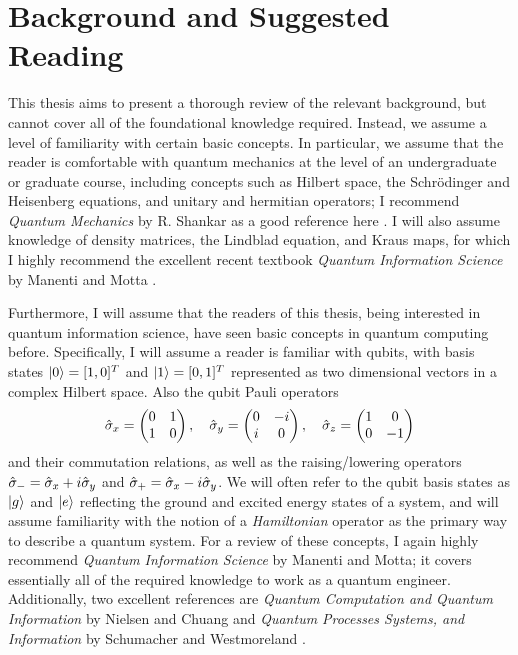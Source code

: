 \section{Background and Suggested Reading}

This thesis aims to present a thorough review of the relevant background, but cannot cover all of the foundational knowledge required. Instead, we assume a level of familiarity with certain basic concepts. In particular, we assume that the reader is comfortable with quantum mechanics at the level of an undergraduate or graduate course, including concepts such as Hilbert space, the Schr\"odinger and Heisenberg equations, and unitary and hermitian operators; I recommend \textit{Quantum Mechanics} by R. Shankar as a good reference here \cite{shankar1994principles}. I will also assume knowledge of density matrices, the Lindblad equation, and Kraus maps, for which I highly recommend the excellent recent textbook \textit{Quantum Information Science} by Manenti and Motta \cite{manenti2023quantum}. 

Furthermore, I will assume that the readers of this thesis, being interested in quantum information science, have seen basic concepts in quantum computing before. Specifically, I will assume a reader is familiar with qubits, with basis states $\lvert0\rangle = [1, 0]^T$ and $\lvert1\rangle = [0, 1]^T$ represented as two dimensional vectors in a complex Hilbert space. Also the qubit Pauli operators
\begin{equation}
    \hat{\sigma}_x = \begin{pmatrix}
        0 & 1 \\ 1 & 0
    \end{pmatrix}, \quad \hat{\sigma}_y = \begin{pmatrix}
        0 & -i \\ i & 0
    \end{pmatrix}, \quad \hat{\sigma}_z = \begin{pmatrix}
        1 & 0 \\ 0 & -1
    \end{pmatrix}
\end{equation}
and their commutation relations, as well as the raising/lowering operators $\hat{\sigma}_- = \hat{\sigma}_x + i\hat{\sigma}_y$ and $\hat{\sigma}_+ = \hat{\sigma}_x - i\hat{\sigma}_y$. We will often refer to the qubit basis states as $\lvert g\rangle$ and $\lvert e\rangle$ reflecting the ground and excited energy states of a system, and will assume familiarity with the notion of a \textit{Hamiltonian} operator as the primary way to describe a quantum system. For a review of these concepts, I again highly recommend \textit{Quantum Information Science} by Manenti and Motta; it covers essentially all of the required knowledge to work as a quantum engineer. Additionally, two excellent references are \textit{Quantum Computation and Quantum Information} by Nielsen and Chuang \cite{ike-and-mike} and \textit{Quantum Processes Systems, and Information} by Schumacher and Westmoreland \cite{schumacher2010quantum}. 

\printbibliography[heading=subbibliography, title = References]
